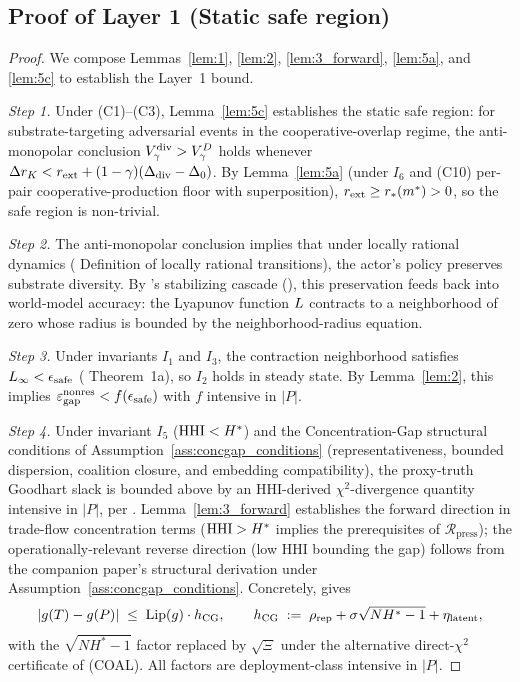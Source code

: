 \subsection{Proof of Layer 1 (Static safe region)}
\label{sec:proof_layer1}

\begin{proof}
We compose Lemmas~\ref{lem:1}, \ref{lem:2}, \ref{lem:3_forward},
\ref{lem:5a}, and \ref{lem:5c} to establish the Layer~1 bound.

\emph{Step 1.} Under (C1)--(C3), Lemma~\ref{lem:5c} establishes the
static safe region: for substrate-targeting adversarial events in
the cooperative-overlap regime, the anti-monopolar conclusion
$V_{\gamma}^{\mathrm{div}} > V_{\gamma}^{D}$ holds whenever $\Delta r_K <
r_{\mathrm{ext}} + (1-\gamma)(\Delta_{\mathrm{div}} - \Delta_0)$. By Lemma~\ref{lem:5a} (under
$I_6$ and (C10) per-pair cooperative-production floor with
superposition), $r_{\mathrm{ext}} \geq r_*(m^*) > 0$, so the safe region is
non-trivial.

\emph{Step 2.} The anti-monopolar conclusion implies that under
locally rational dynamics (\citep[Horizon~Aware]{lasser2026horizon} Definition of locally rational
transitions), the actor's policy preserves substrate diversity. By
\citep[Phase~Redundancy]{lasser2026phase}'s stabilizing cascade
(\citep[Remark on stabilizing cascades]{lasser2026phase}), this
preservation feeds back into world-model accuracy: the Lyapunov
function $L$ contracts to a neighborhood of zero whose radius is
bounded by \citep[Phase~Redundancy]{lasser2026phase} the neighborhood-radius equation.

\emph{Step 3.} Under invariants $I_1$ and $I_3$, the contraction
neighborhood satisfies $L_\infty < \epsilon_{\mathrm{safe}}$
(\citep[Phase~Redundancy]{lasser2026phase} Theorem~1a), so $I_2$ holds in steady state. By
Lemma~\ref{lem:2}, this implies $\varepsilon_{\mathrm{gap}}^{\mathrm{nonres}} < f(\epsilon_{\mathrm{safe}})$
with $f$ intensive in $|P|$.

\emph{Step 4.} Under invariant $I_5$ ($\mathrm{HHI} < H^*$) and the
Concentration-Gap structural conditions of
Assumption~\ref{ass:concgap_conditions} (representativeness,
bounded dispersion, coalition closure, and embedding
compatibility), the proxy-truth Goodhart slack is bounded above
by an HHI-derived $\chi^2$-divergence quantity intensive in
$|P|$, per \citep[Theorem~2]{lasser2026foundations}.
Lemma~\ref{lem:3_forward} establishes the forward direction in
trade-flow concentration terms ($\mathrm{HHI} > H^*$ implies the
prerequisites of $\mathcal{R}_{\mathrm{press}}$); the
operationally-relevant reverse direction (low HHI bounding the
gap) follows from the companion paper's structural derivation
under Assumption~\ref{ass:concgap_conditions}. Concretely,
\citep[Theorem~2]{lasser2026foundations} gives
\[
  |g(T) - g(P)| \;\leq\; \mathrm{Lip}(g) \cdot
  h_{\mathrm{CG}}, \qquad
  h_{\mathrm{CG}} \;:=\; \rho_{\mathrm{rep}} +
  \sigma \sqrt{N H^* - 1} + \eta_{\mathrm{latent}},
\]
with the $\sqrt{N H^* - 1}$ factor replaced by $\sqrt{\Xi}$ under
the alternative direct-$\chi^2$ certificate of (COAL).  All
factors are deployment-class intensive in $|P|$.


\end{proof}
